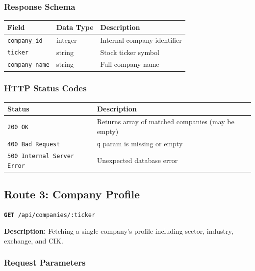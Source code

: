 \documentclass[11pt]{article}
\newcommand{\route}[2]{\texttt{\textcolor{routecolor}{\textbf{#1}}~#2}}
\begin{document}
\subsubsection*{Response Schema}

\begin{center}
\small
\begin{tabular}{l l p{7cm}}
\toprule
\textbf{Field} & \textbf{Data Type} & \textbf{Description} \\
\midrule
\texttt{company\_id}   & integer & Internal company identifier \\
\texttt{ticker}        & string  & Stock ticker symbol \\
\texttt{company\_name} & string  & Full company name \\
\bottomrule
\end{tabular}
\end{center}

\subsubsection*{HTTP Status Codes}

\begin{center}
\small
\begin{tabular}{l p{8cm}}
\toprule
\textbf{Status} & \textbf{Description} \\
\midrule
\texttt{200 OK} & Returns array of matched companies (may be empty) \\
\texttt{400 Bad Request} & \texttt{q} param is missing or empty \\
\texttt{500 Internal Server Error} & Unexpected database error \\
\bottomrule
\end{tabular}
\end{center}

\newpage
\subsection{Route 3: Company Profile}

\route{GET}{/api/companies/:ticker}

\medskip\noindent
\textbf{Description:} Fetching a single company's profile including sector, industry, exchange, and CIK.

\subsubsection*{Request Parameters}
\end{document}
